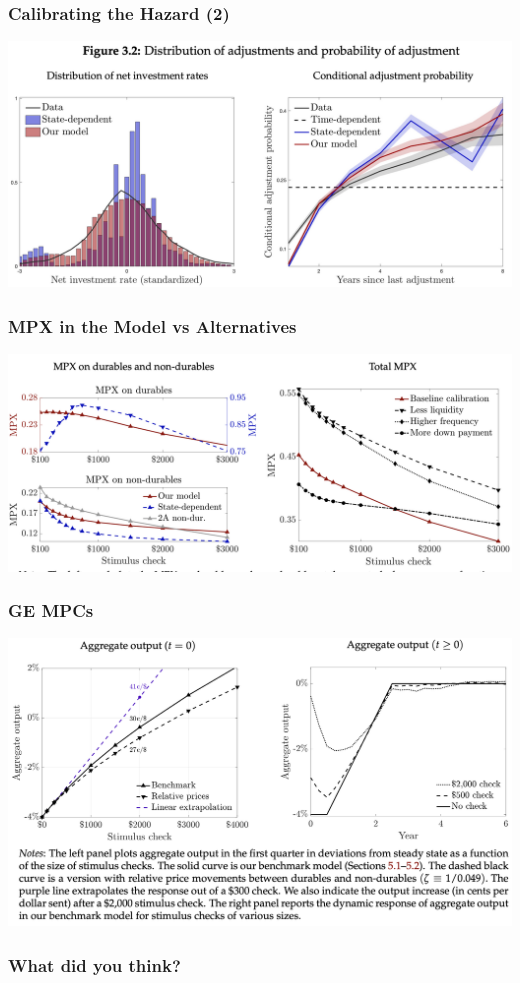 \documentclass[english,xcolor=svgnames]{beamer}
\begin{document}
\begin{frame}
    \frametitle{Calibrating the Hazard (2)}
    \begin{center}
    	\includegraphics[scale=0.3]{figures/BZFIG32.png}	
    \end{center}
\end{frame}

\begin{frame}
    \frametitle{MPX in the Model vs Alternatives}
    \begin{center}
    	\includegraphics[scale=0.3]{figures/BZFIG41.png}	
    \end{center}
\end{frame}

\begin{frame}
    \frametitle{GE MPCs}
    \begin{center}
    	\includegraphics[scale=0.3]{figures/BZFIG51.png}	
    \end{center}
\end{frame}



\begin{frame}
    \frametitle{What did you think?}
\end{frame}
\end{document}
